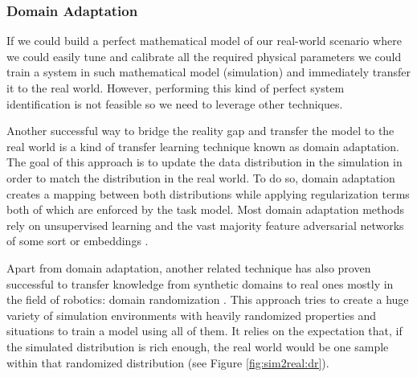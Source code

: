 \clearpage

\subsubsection{Domain Adaptation}

If we could build a perfect mathematical model of our real-world scenario where we could easily tune and calibrate all the required physical parameters we could train a system in such mathematical model (simulation) and immediately transfer it to the real world. However, performing this kind of perfect system identification is not feasible so we need to leverage other techniques.

Another successful way to bridge the reality gap and transfer the model to the real world is a kind of transfer learning technique known as domain adaptation. The goal of this approach is to update the data distribution in the simulation in order to match the distribution in the real world. To do so, domain adaptation creates a mapping between both distributions while applying regularization terms both of which are enforced by the task model. Most domain adaptation methods rely on unsupervised learning and the vast majority feature adversarial networks of some sort \cite{Pinheiro2018, Sankaranarayanan2018, Hong2018} or embeddings \cite{Murez2018} .

Apart from domain adaptation, another related technique has also proven successful to transfer knowledge from synthetic domains to real ones mostly in the field of robotics: domain randomization \cite{Tremblay2018, Tobin2017, Mehta2019}. This approach tries to create a huge variety of simulation environments with heavily randomized properties and situations to train a model using all of them. It relies on the expectation that, if the simulated distribution is rich enough, the real world would be one sample within that randomized distribution (see Figure \ref{fig:sim2real:dr}).

